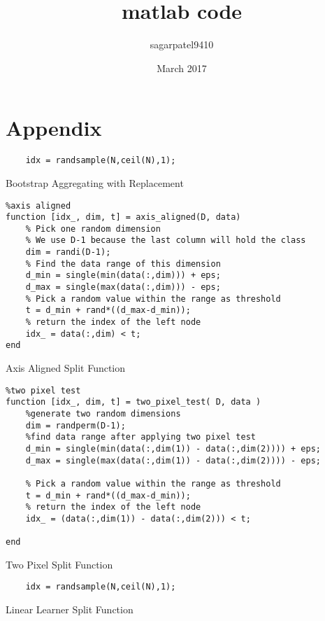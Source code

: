 \documentclass{article}
\title{matlab code}
\author{sagarpatel9410 }
\date{March 2017}
\begin{document}
\maketitle

\section{Appendix}

\begin{listing}
\begin{verbatim}
    idx = randsample(N,ceil(N),1); 
\end{verbatim}
\caption{Bootstrap Aggregating with Replacement}
\end{listing}


\begin{listing}
\begin{verbatim}
%axis aligned
function [idx_, dim, t] = axis_aligned(D, data)
    % Pick one random dimension
    % We use D-1 because the last column will hold the class
    dim = randi(D-1);
    % Find the data range of this dimension
    d_min = single(min(data(:,dim))) + eps; 
    d_max = single(max(data(:,dim))) - eps;
    % Pick a random value within the range as threshold
    t = d_min + rand*((d_max-d_min)); 
    % return the index of the left node
    idx_ = data(:,dim) < t;
end
\end{verbatim}
\caption{Axis Aligned Split Function}
\end{listing}


\begin{listing}
\begin{verbatim}
%two pixel test
function [idx_, dim, t] = two_pixel_test( D, data )
    %generate two random dimensions
    dim = randperm(D-1);
    %find data range after applying two pixel test
    d_min = single(min(data(:,dim(1)) - data(:,dim(2)))) + eps;
    d_max = single(max(data(:,dim(1)) - data(:,dim(2)))) - eps;
    
    % Pick a random value within the range as threshold
    t = d_min + rand*((d_max-d_min));
    % return the index of the left node
    idx_ = (data(:,dim(1)) - data(:,dim(2))) < t;

end
\end{verbatim}


\caption{Two Pixel Split Function}
\end{listing}

\begin{listing}
\begin{verbatim}
    idx = randsample(N,ceil(N),1); 
\end{verbatim}\caption{Linear Learner Split Function}
\end{listing}
\end{document}

